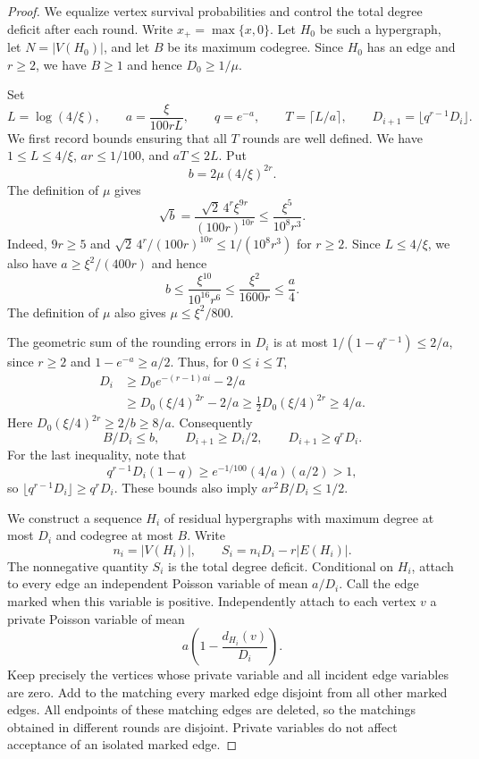 \documentclass[11pt]{article}
\begin{document}
\begin{proof}
We equalize vertex survival probabilities and control the total degree
deficit after each round. Write $x_+=\max\{x,0\}$.
Let $H_0$ be such a hypergraph, let $N=|V(H_0)|$, and let $B$ be its maximum codegree.
 Since $H_0$ has an edge and $r\ge2$, we have $B\ge1$ and hence $D_0\ge1/\mu$.

Set
\[
 L=\log(4/\xi),\qquad a=\frac{\xi}{100rL},\qquad q=e^{-a},
 \qquad T=\lceil L/a\rceil,
 \qquad D_{i+1}=\lfloor q^{r-1}D_i\rfloor.
\]
We first record bounds ensuring that all $T$ rounds are well defined. We have $1\le
 L\le4/\xi$, $ar\le1/100$, and $aT\le2L$. Put
\[
 b=2\mu(4/\xi)^{2r}.
\]
The definition of $\mu$ gives
\begin{equation}\label{eq:b}
 \sqrt b=\frac{\sqrt2\,4^r\xi^{9r}}{(100r)^{10r}}
 \le \frac{\xi^5}{10^8r^3}.
\end{equation}
Indeed, $9r\ge5$ and
$\sqrt2\,4^r/(100r)^{10r}\le1/(10^8r^3)$ for $r\ge2$.
Since $L\le4/\xi$, we also have $a\ge\xi^2/(400r)$ and hence
\[
 b\le\frac{\xi^{10}}{10^{16}r^6}
   \le\frac{\xi^2}{1600r}\le\frac a4.
\]
The definition of $\mu$ also gives $\mu\le\xi^2/800$.

The geometric sum of the rounding errors in $D_i$ is at most
$1/(1-q^{r-1})\le2/a$, since $r\ge2$ and
$1-e^{-a}\ge a/2$. Thus, for $0\le i\le T$,
\begin{align*}
 D_i&\ge D_0e^{-(r-1)ai}-2/a\\
 &\ge D_0(\xi/4)^{2r}-2/a
 \ge \tfrac12D_0(\xi/4)^{2r}\ge4/a.
\end{align*}
Here $D_0(\xi/4)^{2r}\ge2/b\ge8/a$. Consequently
\begin{equation}\label{eq:degreebounds}
 B/D_i\le b,\qquad D_{i+1}\ge D_i/2,
 \qquad D_{i+1}\ge q^rD_i.
\end{equation}
For the last inequality, note that
\[
 q^{r-1}D_i(1-q)\ge e^{-1/100}(4/a)(a/2)>1,
\]
so $\lfloor q^{r-1}D_i\rfloor\ge q^rD_i$. These bounds also imply $ar^2B/D_i\le1/2$.

We construct a sequence $H_i$ of residual hypergraphs with maximum degree at most $D_i$
 and codegree at most $B$. Write
\[
 n_i=|V(H_i)|,\qquad S_i=n_iD_i-r|E(H_i)|.
\]
The nonnegative quantity $S_i$ is the total degree deficit. Conditional on $H_i$, attach
 to every edge an independent Poisson variable of mean $a/D_i$. Call the edge marked
 when this variable is positive. Independently attach to each vertex $v$ a private
 Poisson variable of mean
\[
 a\left(1-\frac{d_{H_i}(v)}{D_i}\right).
\]
Keep precisely the vertices whose private variable and all incident edge variables are
 zero. Add to the matching every marked edge disjoint from all other marked edges. All
 endpoints of these matching edges are deleted, so the matchings obtained in different
 rounds are disjoint. Private variables do not affect acceptance of an isolated marked
 edge.


\end{proof}
\end{document}
